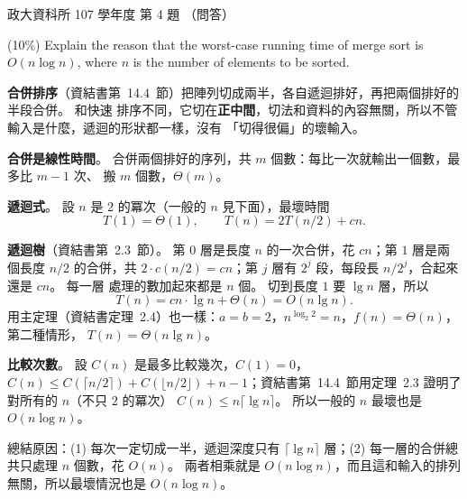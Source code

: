 \begin{pastexam}[label={px:nccu-107-dsa-04}]{政大資科所 107 學年度 第 4 題}
（問答）

(10\%) Explain the reason that the worst-case running time of merge sort is $O(n\log n)$, where $n$
is the number of elements to be sorted.
\end{pastexam}

\begin{pastsoln}
\textbf{合併排序}（資結書第~14.4~節）把陣列切成兩半，各自遞迴排好，再把兩個排好的半段合併。 和快速
排序不同，它切在\textbf{正中間}，切法和資料的內容無關，所以不管輸入是什麼，遞迴的形狀都一樣，沒有
「切得很偏」的壞輸入。

\textbf{合併是線性時間}。 合併兩個排好的序列，共 $m$ 個數：每比一次就輸出一個數，最多比 $m - 1$ 次、
搬 $m$ 個數，$\Theta(m)$。

\textbf{遞迴式}。 設 $n$ 是 $2$ 的冪次（一般的 $n$ 見下面），最壞時間
\[
T(1) = \Theta(1), \qquad T(n) = 2T(n/2) + cn.
\]

\textbf{遞迴樹}（資結書第~2.3~節）。 第 $0$ 層是長度 $n$ 的一次合併，花 $cn$；第 $1$ 層是兩個長度
$n/2$ 的合併，共 $2 \cdot c(n/2) = cn$；第 $j$ 層有 $2^j$ 段，每段長 $n/2^j$，合起來還是 $cn$。 每一層
處理的數加起來都是 $n$ 個。 切到長度 $1$ 要 $\lg n$ 層，所以
\[
T(n) = cn \cdot \lg n + \Theta(n) = O(n \lg n).
\]
用主定理（資結書定理~2.4）也一樣：$a = b = 2$，$n^{\log_2 2} = n$，$f(n) = \Theta(n)$，第二種情形，
$T(n) = \Theta(n \lg n)$。

\textbf{比較次數}。 設 $C(n)$ 是最多比較幾次，$C(1) = 0$，$C(n) \le C(\lceil n/2 \rceil) +
C(\lfloor n/2 \rfloor) + n - 1$；資結書第~14.4~節用定理~2.3 證明了對所有的 $n$（不只 $2$ 的冪次）
$C(n) \le n \lceil \lg n \rceil$。 所以一般的 $n$ 最壞也是 $O(n \log n)$。

總結原因：(1) 每次一定切成一半，遞迴深度只有 $\lceil \lg n \rceil$ 層；(2) 每一層的合併總共只處理
$n$ 個數，花 $O(n)$。 兩者相乘就是 $O(n \log n)$，而且這和輸入的排列無關，所以最壞情況也是
$O(n \log n)$。
\end{pastsoln}
